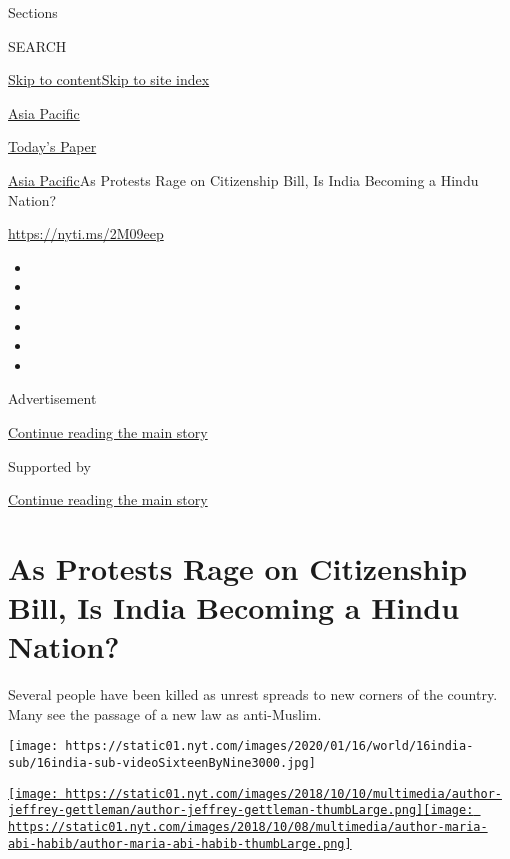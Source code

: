 Sections

SEARCH

\protect\hyperlink{site-content}{Skip to
content}\protect\hyperlink{site-index}{Skip to site index}

\href{https://www.nytimes.com/section/world/asia}{Asia Pacific}

\href{https://myaccount.nytimes.com/auth/login?response_type=cookie\&client_id=vi}{}

\href{https://www.nytimes.com/section/todayspaper}{Today's Paper}

\href{/section/world/asia}{Asia Pacific}\textbar{}As Protests Rage on
Citizenship Bill, Is India Becoming a Hindu Nation?

\url{https://nyti.ms/2M09eep}

\begin{itemize}
\item
\item
\item
\item
\item
\item
\end{itemize}

Advertisement

\protect\hyperlink{after-top}{Continue reading the main story}

Supported by

\protect\hyperlink{after-sponsor}{Continue reading the main story}

\hypertarget{as-protests-rage-on-citizenship-bill-is-india-becoming-a-hindu-nation}{%
\section{As Protests Rage on Citizenship Bill, Is India Becoming a Hindu
Nation?}\label{as-protests-rage-on-citizenship-bill-is-india-becoming-a-hindu-nation}}

Several people have been killed as unrest spreads to new corners of the
country. Many see the passage of a new law as anti-Muslim.

\texttt{[image: https://static01.nyt.com/images/2020/01/16/world/16india-sub/16india-sub-videoSixteenByNine3000.jpg]}

\href{https://www.nytimes.com/by/jeffrey-gettleman}{\texttt{[image: https://static01.nyt.com/images/2018/10/10/multimedia/author-jeffrey-gettleman/author-jeffrey-gettleman-thumbLarge.png]}}\href{https://www.nytimes.com/by/maria-abi-habib}{\texttt{[image: https://static01.nyt.com/images/2018/10/08/multimedia/author-maria-abi-habib/author-maria-abi-habib-thumbLarge.png]}}


